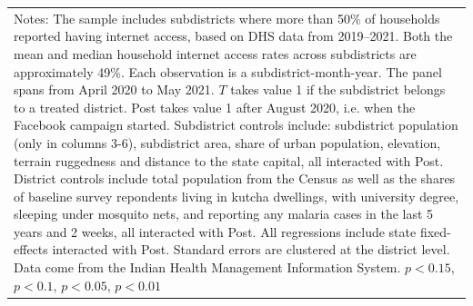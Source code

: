 {{\begin{tabular}{l*{6}{c}}
\multicolumn{7}{p{0.75\linewidth}}{\scriptsize Notes: The sample includes subdistricts where more than 50\% of households reported having internet access, based on DHS data from 2019–2021. Both the mean and median household internet access rates across subdistricts are approximately 49\%. Each observation is a subdistrict-month-year. The panel spans from April 2020 to May 2021. \(T\) takes value 1 if the subdistrict belongs to a treated district. Post takes value 1 after August 2020, i.e. when the Facebook campaign started. Subdistrict controls include: subdistrict population (only in columns 3-6), subdistrict area, share of urban population, elevation, terrain ruggedness and distance to the state capital, all interacted with Post. District controls include total population from the Census as well as the shares of baseline survey repondents living in kutcha dwellings, with university degree, sleeping under mosquito nets, and reporting any malaria cases in the last 5 years and 2 weeks, all interacted with Post. All regressions include state fixed-effects interacted with Post. Standard errors are clustered at the district level. Data come from the Indian Health Management Information System. \sym{+} \(p<0.15\), \sym{*} \(p<0.1\), \sym{**} \(p<0.05\), \sym{***} \(p<0.01\)}\\
\end{tabular}
}%

}
